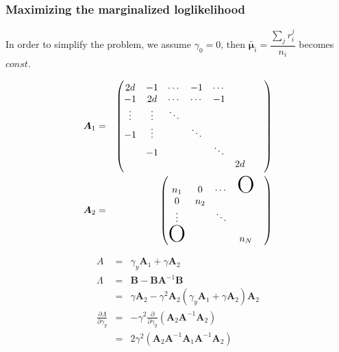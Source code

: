 \documentclass[platex, a4paper]{jsarticle}
\begin{document}
\subsubsection{Maximizing the marginalized loglikelihood}
In order to simplify the problem,
we assume $\gamma_0=0$, then $\tilde{\bm{\mu}_i} = \dfrac {\sum _{j}r_{i}^{j}} {n_{i}}$ becomes $const$.

\begin{eqnarray}
  \bm{A}_1 &=&
    \begin{pmatrix}
      2d & -1 & \cdots & -1 & \cdots &\\
      -1 & 2d &\cdots &  \cdots &  -1  &  \\
      \vdots&\vdots& \ddots &&& \\
      -1 &\vdots&& \ddots &&& \\
      & -1 &&& \ddots &&& \\
      &&&&& 2d \\
    \end{pmatrix} \\
  \bm{A}_2  &=&
    \begin{pmatrix}
      n_1 & 0 & \cdots & \mbox{\Huge O}\\
      0 & n_2 & && \\
      \vdots & & \ddots \\
      \mbox{\Huge O}&&& n_N
    \end{pmatrix}
\end{eqnarray}

\begin{eqnarray}
  A &=& \gamma_y \bm{A}_1 + \gamma \bm{A}_2 \\
  \Lambda &=& \bm{B} - \bm{B} \bm{A}^{-1} \bm{B}\\
           &=& \gamma \bm{A}_2 - \gamma^2 \bm{A}_2 (\gamma_y \bm{A}_1 + \gamma \bm{A}_2) \bm{A}_2 \\
  \frac{\partial \Lambda}{\partial \gamma_y} &=& - \gamma^2 \frac{\partial}{\partial \gamma_y}
    \left(\bm{A}_2 \bm{A}^{-1} \bm{A}_2  \right) \\
    &=& 2 \gamma^2  \left(\bm{A}_2 \bm{A}^{-1} \bm{A}_1 \bm{A}^{-1} \bm{A}_2  \right)
\end{eqnarray}
\end{document}
